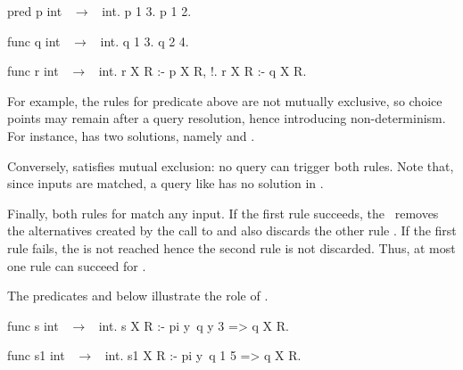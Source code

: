 \mvspace
\noindent
\begin{minipage}{.33\textwidth}
\begin{elpicode}
pred p int ~$\to$~ int.
p 1 3. 
p 1 2.
\end{elpicode}
\end{minipage}
\begin{minipage}{.33\textwidth}
\begin{elpicode}
func q int ~$\to$~ int.
q 1 3.
q 2 4.
\end{elpicode}
\end{minipage}
\noindent
\begin{minipage}{.33\textwidth}
\begin{elpicode}
func r int ~$\to$~ int.
r X R :- p X R, !. 
r X R :- q X R.
\end{elpicode}
\end{minipage}
\mvspace

For example, the rules for predicate  above are not mutually exclusive, so choice points may
remain after a query resolution, hence introducing non-determinism.
For instance,  has two solutions, namely
 and .

\noindent
Conversely,  satisfies mutual exclusion: no query can trigger both
rules. Note that, since inputs are matched, a query like  has no
solution in \elpi. %

Finally, both rules for  match any input.
If the first rule succeeds, the \cut\ removes the alternatives
created by the call to  and also 
discards the 
other rule . 
If the first rule fails, the \cut is not reached hence
the second rule is not discarded.
Thus, at most one rule can succeed for .

The predicates  and  below illustrate the role of \pi.

\mvspace
\begin{minipage}{.5\textwidth}
\begin{elpicode}
func s int ~$\to$~ int.
s X R :- pi y\ q y 3 => q X R.
\end{elpicode}
\end{minipage}
\begin{minipage}{.5\textwidth}
\begin{elpicode}
func s1 int ~$\to$~ int.
s1 X R :- pi y\ q 1 5 => q X R. 
~ ~
\end{elpicode}
\end{minipage}
\mvspace

